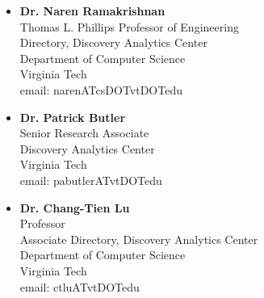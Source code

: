 
\begin{itemize}
  \item \textbf{Dr. Naren Ramakrishnan}\\
    Thomas L. Phillips Professor of Engineering\\
    Directory, Discovery Analytics Center\\
    Department of Computer Science\\
    Virginia Tech\\
    email: narenATcsDOTvtDOTedu

  \item \textbf{Dr. Patrick Butler}\\
    Senior Research Associate\\
    Discovery Analytics Center\\
    Virginia Tech\\
    email: pabutlerATvtDOTedu

  \item \textbf{Dr. Chang-Tien Lu}\\
    Professor\\
    Associate Directory, Discovery Analytics Center\\
    Department of Computer Science\\
    Virginia Tech\\
    email: ctluATvtDOTedu
\end{itemize}



